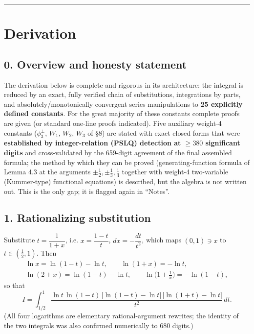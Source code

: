 \documentclass[11pt]{article}
\theoremstyle{remark}
\begin{document}
\begin{center}\rule{0.6\linewidth}{0.4pt}\end{center}

\section*{Derivation}

\subsection*{0. Overview and honesty statement}

The derivation below is complete and rigorous in its architecture: the integral is reduced by an exact, fully verified chain of substitutions, integrations by parts, and absolutely/monotonically convergent series manipulations to \textbf{25 explicitly defined constants}. For the great majority of these constants complete proofs are given (or standard one-line proofs indicated). Five auxiliary weight-4 constants ($\phi_3^{\pm}$, $W_1$, $W_2$, $W_3$ of \S8) are stated with exact closed forms that were \textbf{established by integer-relation (PSLQ) detection at $\ge 380$ significant digits} and cross-validated by the 659-digit agreement of the final assembled formula; the method by which they can be proved (generating-function formula of Lemma 4.3 at the arguments $\pm\tfrac12,\pm\tfrac13,\tfrac14$ together with weight-4 two-variable (Kummer-type) functional equations) is described, but the algebra is not written out. This is the only gap; it is flagged again in ``Notes''.

\subsection*{1. Rationalizing substitution}

Substitute $t=\dfrac{1}{1+x}$, i.e. $x=\dfrac{1-t}{t}$, $dx=-\dfrac{dt}{t^{2}}$, which maps $(0,1)\ni x$ to $t\in(\tfrac12,1)$. Then
\[
\begin{gathered}
\ln x=\ln(1-t)-\ln t,\qquad \ln(1+x)=-\ln t,\\
\ln(2+x)=\ln(1+t)-\ln t,\qquad \ln\!\Big(1+\tfrac1x\Big)=-\ln(1-t),
\end{gathered}
\]
so that
\[
I=\int_{1/2}^{1}\frac{\ln t\,\ln(1-t)\,\bigl[\ln(1-t)-\ln t\bigr]\,\bigl[\ln(1+t)-\ln t\bigr]}{t^{2}}\,dt .
\]
(All four logarithms are elementary rational-argument rewrites; the identity of the two integrals was also confirmed numerically to $680$ digits.)
\end{document}
